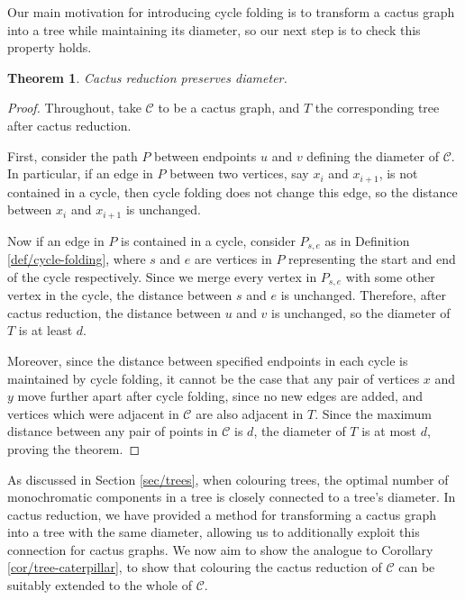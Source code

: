 \documentclass{mpaper}
\newtheorem{theorem}{Theorem}[section]
\begin{document}
Our main motivation for introducing cycle folding is to transform a cactus graph into a tree while maintaining its diameter, so our next step is to check this property holds.

\begin{theorem}
  \label{thm/cactus-reduction-diameter}
Cactus reduction preserves diameter.
\end{theorem}

\begin{proof}

Throughout, take $\mathcal{C}$ to be a cactus graph, and $T$ the corresponding tree after cactus reduction.
  
First, consider the path $P$ between endpoints $u$ and $v$ defining the diameter of $\mathcal{C}$. In particular, if an edge in $P$ between two vertices, say $x_i$ and $x_{i+1}$, is not contained in a cycle, then cycle folding does not change this edge, so the distance between $x_i$ and $x_{i+1}$ is unchanged.

Now if an edge in $P$ is contained in a cycle, consider $P_{s,e}$ as in Definition \ref{def/cycle-folding}, where $s$ and $e$ are vertices in $P$ representing the start and end of the cycle respectively. Since we merge every vertex in $P_{s,e}$ with some other vertex in the cycle, the distance between $s$ and $e$ is unchanged. Therefore, after cactus reduction, the distance between $u$ and $v$ is unchanged, so the diameter of $T$ is at least $d$.

Moreover, since the distance between specified endpoints in each cycle is maintained by cycle folding, it cannot be the case that any pair of vertices $x$ and $y$ move further apart after cycle folding, since no new edges are added, and vertices which were adjacent in $\mathcal{C}$ are also adjacent in $T$. Since the maximum distance between any pair of points in $\mathcal{C}$ is $d$, the diameter of $T$ is at most $d$, proving the theorem.
\end{proof}

As discussed in Section \ref{sec/trees}, when colouring trees, the optimal number of monochromatic components in a tree is closely connected to a tree's diameter. In cactus reduction, we have provided a method for transforming a cactus graph into a tree with the same diameter, allowing us to additionally exploit this connection for cactus graphs. We now aim to show the analogue to Corollary \ref{cor/tree-caterpillar}, to show that colouring the cactus reduction of $\mathcal{C}$ can be suitably extended to the whole of $\mathcal{C}$.
\end{document}
